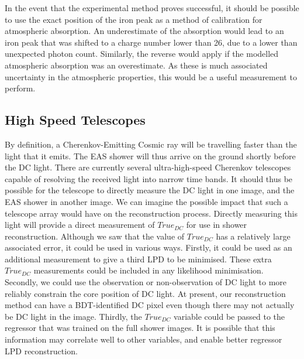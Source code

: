\documentclass[11pt]{article}
\begin{document}
In the event that the experimental method proves successful, it should be possible to use the exact position of the iron peak as a method of calibration for atmospheric absorption. An underestimate of the absorption would lead to an iron peak that was shifted to a charge number lower than 26, due to a lower than unexpected photon count. Similarly, the reverse would apply if the modelled atmospheric absorption was an overestimate. As these is much associated uncertainty in the atmospheric properties, this would be a useful measurement to perform.

\subsection{High Speed Telescopes}
By definition, a Cherenkov-Emitting Cosmic ray will be travelling faster than the light that it emits. The EAS shower will thus arrive on the ground shortly before the DC light. There are currently several ultra-high-speed Cherenkov telescopes capable of resolving the received light into narrow time bands. It should thus be possible for the telescope to directly measure the DC light in one image, and the EAS shower in another image. We can imagine the possible impact that such a telescope array would have on the reconstruction process. Directly measuring this light will provide a direct measurement of $True_{DC}$ for use in shower reconstruction. Although we saw that the value of $True_{DC}$ has a relatively large associated error, it could be used in various ways. Firstly, it could be used as an additional measurement to give a third LPD to be minimised. These extra $True_{DC}$ measurements could be included in any likelihood minimisation. Secondly, we could use the observation or non-observation of DC light to more reliably constrain the core position of DC light. At present, our reconstruction method can have a BDT-identified DC pixel even though there may not actually be DC light in the image. Thirdly, the $True_{DC}$ variable could be passed to the regressor that was trained on the full shower images. It is possible that this information may correlate well to other variables, and enable better regressor LPD reconstruction.
\end{document}
